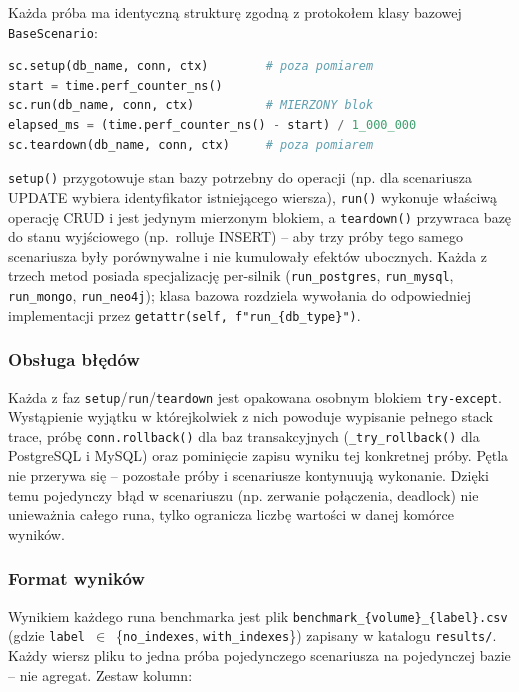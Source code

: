 Każda próba ma identyczną strukturę zgodną z protokołem klasy
bazowej \texttt{BaseScenario}:

\begin{lstlisting}[language=Python,basicstyle=\ttfamily\small]
sc.setup(db_name, conn, ctx)        # poza pomiarem
start = time.perf_counter_ns()
sc.run(db_name, conn, ctx)          # MIERZONY blok
elapsed_ms = (time.perf_counter_ns() - start) / 1_000_000
sc.teardown(db_name, conn, ctx)     # poza pomiarem
\end{lstlisting}

\noindent \texttt{setup()} przygotowuje stan bazy potrzebny do
operacji (np. dla scenariusza UPDATE wybiera identyfikator
istniejącego wiersza), \texttt{run()} wykonuje właściwą operację
CRUD i jest jedynym mierzonym blokiem, a \texttt{teardown()}
przywraca bazę do stanu wyjściowego (np.~rolluje INSERT)
-- aby trzy próby tego samego scenariusza były porównywalne i
nie kumulowały efektów ubocznych. Każda z trzech metod
posiada specjalizację per-silnik
(\texttt{run\_postgres}, \texttt{run\_mysql}, \texttt{run\_mongo},
\texttt{run\_neo4j}); klasa bazowa rozdziela wywołania do
odpowiedniej implementacji przez \texttt{getattr(self,
f"run\_\{db\_type\}")}.

\subsubsection*{Obsługa błędów}

Każda z faz \texttt{setup}/\texttt{run}/\texttt{teardown} jest opakowana
osobnym blokiem \texttt{try-except}. Wystąpienie wyjątku w którejkolwiek
z nich powoduje wypisanie pełnego stack trace, próbę
\texttt{conn.rollback()} dla baz transakcyjnych
(\texttt{\_try\_rollback()} dla PostgreSQL i MySQL) oraz pominięcie
zapisu wyniku tej konkretnej próby. Pętla nie przerywa się -- pozostałe
próby i scenariusze kontynuują wykonanie. Dzięki temu pojedynczy błąd
w scenariuszu (np. zerwanie połączenia, deadlock) nie unieważnia
całego runa, tylko ogranicza liczbę wartości w danej komórce wyników.

\subsubsection*{Format wyników}

Wynikiem każdego runa benchmarka jest plik
\texttt{benchmark\_\{volume\}\_\{label\}.csv} (gdzie
\texttt{label}~$\in$~\{\texttt{no\_indexes}, \texttt{with\_indexes}\})
zapisany w katalogu \texttt{results/}. Każdy wiersz pliku to jedna
próba pojedynczego scenariusza na pojedynczej bazie -- nie agregat.
Zestaw kolumn:

